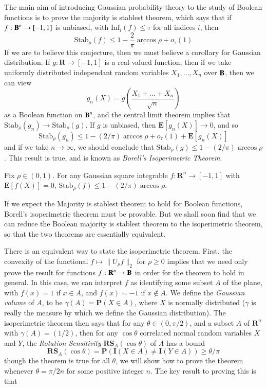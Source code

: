 The main aim of introducing Gaussian probability theory to the study of Boolean functions is to prove the majority is stablest theorem, which says that if $f: \operatorname{\mathbf{B}}^n \to [-1,1]$ is unbiased, with $\text{Inf}_i(f) \leq \tau$ for all indices $i$, then
%
\[ \text{Stab}_\rho(f) \leq 1 - \frac{2}{\pi} \arccos \rho + o_\tau(1) \]
%
If we are to believe this conjecture, then we must believe a corollary for Gaussian distribution. If $g: \mathbf{R} \to [-1,1]$ is a real-valued function, then if we take uniformly distributed independant random variables $X_1, \dots, X_n$ over $\operatorname{\mathbf{B}}$, then we can view
%
\[ g_n(X) = g \left( \frac{X_1 + \dots + X_n}{\sqrt{n}} \right) \]
%
as a Boolean function on $\operatorname{\mathbf{B}}^n$, and the central limit theorem implies that $\text{Stab}_\rho(g_n) \to \text{Stab}_\rho(g)$. If $g$ is unbiased, then $\mathbf{E}[g_n(X)] \to 0$, and so
%
\[ \text{Stab}_\rho(g_n) \leq 1 - (2/\pi) \arccos \rho + o_\tau(1) + \mathbf{E}[g_n(X)] \]
%
and if we take $n \to \infty$, we should conclude that $\text{Stab}_\rho(g) \leq 1 - (2/\pi) \arccos \rho$. This result is true, and is known as \emph{Borell's Isoperimetric Theorem}.

\begin{theorem}
    Fix $\rho \in (0,1)$. For any Gaussian square integrable $f: \mathbf{R}^n \to [-1,1]$ with $\mathbf{E}[f(X)] = 0$, $\text{Stab}_\rho(f) \leq 1 - (2/\pi) \arccos \rho$.
\end{theorem}

If we expect the Majority is stablest theorem to hold for Boolean functions, Borell's isoperimetric theorem must be provable. But we shall soon find that we can reduce the Boolean majority is stablest theorem to the isoperimetric theorem, so that the two theorems are essentially equivalent.

There is an equivalent way to state the isoperimetric theorem. First, the convexity of the functional $f \mapsto \| U_\rho f \|_2$ for $\rho \geq 0$ implies that we need only prove the result for functions $f: \mathbf{R}^n \to \operatorname{\mathbf{B}}$ in order for the theorem to hold in general. In this case, we can interpret $f$ as identifying some subset $A$ of the plane, with $f(x) = 1$ if $x \in A$, and $f(x) = -1$ if $x \not \in A$. We define the \emph{Gaussian volume} of $A$, to be $\gamma(A) = \mathbf{P}(X \in A)$, where $X$ is normally distributed ($\gamma$ is really the measure by which we define the Gaussian distribution). The isoperimetric theorem then says that for any $\theta \in (0,\pi/2)$, and a subset $A$ of $\mathbf{R}^n$ with $\gamma(A) = (1/2)$, then for any $\cos \theta$ correlated normal random variables $X$ and $Y$, the \emph{Rotation Sensitivity} $\mathbf{RS}_A(\cos \theta)$ of $A$ has a bound
%
\[ \mathbf{RS}_A(\cos \theta) = \mathbf{P}(\mathbf{I}(X \in A) \neq \mathbf{I}(Y \in A)) \geq \theta / \pi \]
%
though the theorem is true for all $\theta$, we will show how to prove the theorem whenever $\theta = \pi/2n$ for some positive integer $n$. The key result to proving this is that

